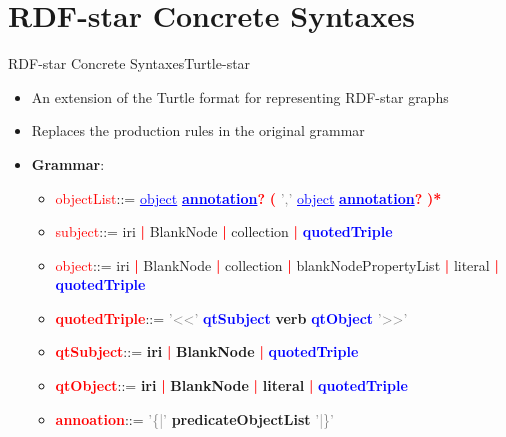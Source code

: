 \documentclass[aspectratio=169]{beamer}
\begin{document}
\section{RDF-star Concrete Syntaxes}
\begin{frame}[fragile]{RDF-star Concrete Syntaxes}{Turtle-star}
\begin{itemize}
    \item An extension of the Turtle format for representing RDF-star graphs
    \item Replaces the production rules in the original grammar
    \item \textbf{Grammar}:
    \begin{itemize}
        \item \textcolor{red}{objectList}\quad\quad\quad::= \textcolor{blue}{\underline{object}} \textcolor{blue}{\textbf{\underline{annotation}}}\textcolor{red}{\textbf{?}} \textcolor{red}{\textbf{(}} \textcolor{gray}{','} \textcolor{blue}{\underline{object}} \textcolor{blue}{\textbf{\underline{annotation}}}\textcolor{red}{\textbf{?}} \textcolor{red}{\textbf{)*}}
        \item \textcolor{red}{subject}\quad::= iri \textcolor{red}{\textbf{|}} BlankNode \textcolor{red}{\textbf{|}} collection \textcolor{red}{\textbf{|}} \textcolor{blue}{\textbf{quotedTriple}}
        \item \textcolor{red}{object}\quad::= iri \textcolor{red}{\textbf{|}} BlankNode \textcolor{red}{\textbf{|}} collection \textcolor{red}{\textbf{|}} blankNodePropertyList \textcolor{red}{\textbf{|}} literal \textcolor{red}{\textbf{|}} \textcolor{blue}{\textbf{quotedTriple}}
        \item \textcolor{red}{\textbf{quotedTriple}}\quad::= \textcolor{gray}{'<<'} \textcolor{blue}{\textbf{qtSubject}} \textbf{verb} \textcolor{blue}{\textbf{qtObject}} \textcolor{gray}{'>>'}
        \item \textcolor{red}{\textbf{qtSubject}}\quad::= \textbf{iri} \textcolor{red}{\textbf{|}} \textbf{BlankNode} \textcolor{red}{\textbf{|}} \textcolor{blue}{\textbf{quotedTriple}}
        \item \textcolor{red}{\textbf{qtObject}}\quad::= \textbf{iri} \textcolor{red}{\textbf{|}} \textbf{BlankNode} \textcolor{red}{\textbf{|}} \textbf{literal} \textcolor{red}{\textbf{|}} \textcolor{blue}{\textbf{quotedTriple}}
        \item \textcolor{red}{\textbf{annoation}}\quad::= \textcolor{gray}{'\{|'} \textbf{predicateObjectList} \textcolor{gray}{'|\}'}
    \end{itemize}
\end{itemize}
\end{frame}
\end{document}
